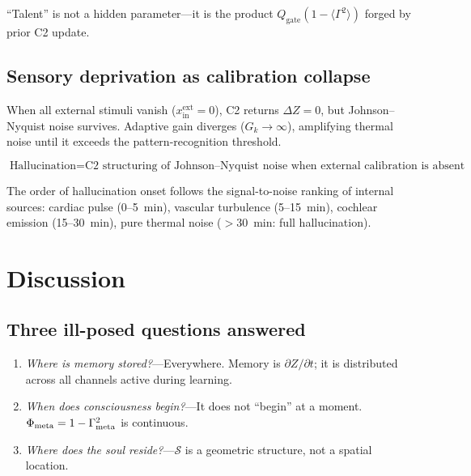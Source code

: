 \documentclass[aps,pre,twocolumn,superscriptaddress,floatfix]{revtex4-2}
\begin{document}
\begin{remark}
\label{rem:expert-effortless}
``Talent'' is not a hidden parameter---it is the
product $Q_{\text{gate}} (1 - \langle\Gamma^2\rangle)$
forged by prior C2 update.
\end{remark}

\subsection{Sensory deprivation as calibration collapse}
\label{sec:sensory-deprivation}

When all external stimuli vanish
($x_{\text{in}}^{\text{ext}} = 0$), C2 returns
$\Delta Z = 0$, but Johnson--Nyquist noise survives.
Adaptive gain diverges ($G_k \to \infty$), amplifying
thermal noise until it exceeds the pattern-recognition
threshold.

\begin{equation}
  \boxed{
  \text{Hallucination}
  = \text{C2 structuring of Johnson--Nyquist noise
         when external calibration is absent}
  }
  \label{eq:hallucination-unified}
\end{equation}

The order of hallucination onset follows the
signal-to-noise ranking of internal sources:
cardiac pulse (0--5~min), vascular turbulence (5--15~min),
cochlear emission (15--30~min), pure thermal noise
($>$30~min: full hallucination).


\section{Discussion}
\label{sec:discussion}

\subsection{Three ill-posed questions answered}

\begin{enumerate}
  \item \emph{Where is memory stored?}---Everywhere.
    Memory is $\partial Z/\partial t$; it is distributed
    across all channels active during learning.
  \item \emph{When does consciousness begin?}---It does not
    ``begin'' at a moment.
    $\Phi_{\text{meta}}=1-\Gamma_{\text{meta}}^2$ is continuous.
  \item \emph{Where does the soul reside?}---$\mathcal{S}$
    is a geometric structure,
    not a spatial location.
\end{enumerate}
\end{document}

